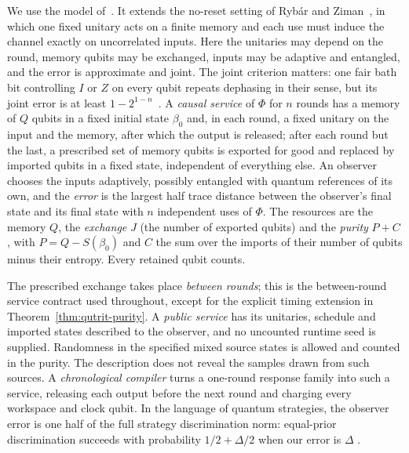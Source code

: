 We use the model of~\cite[Definition~2.3]{DouglasMghirbiB}. It extends the no-reset setting of Ryb\'ar and Ziman~\cite{RybarZiman2008},
in which one fixed unitary acts on a finite memory and each use must induce the channel exactly on uncorrelated inputs. Here the unitaries may
depend on the round, memory qubits may be exchanged, inputs may be adaptive and entangled, and the error is approximate and joint. The joint
criterion matters: one fair bath bit controlling $I$ or $Z$ on every qubit repeats dephasing in their sense, but its joint error is at least
$1-2^{1-n}$~\cite[Proposition~8.1]{DouglasClosedMemory}. A \emph{causal service} of $\Phi$ for $n$ rounds has a memory of $Q$ qubits in a
fixed initial state $\beta_0$ and, in each round, a fixed unitary on the input and the memory, after which the output is released; after each
round but the last, a prescribed set of memory qubits is exported for good and replaced by imported qubits in a fixed state, independent of
everything else. An observer chooses the inputs adaptively, possibly entangled with quantum references of its own, and the \emph{error} is
the largest half trace distance between the observer's final state and its final state with $n$ independent uses of $\Phi$. The resources are
the memory $Q$, the \emph{exchange} $J$ (the number of exported qubits) and the \emph{purity} $P+C$, with $P=Q-S(\beta_0)$ and $C$ the sum over the
imports of their number of qubits minus their entropy. Every retained qubit counts.

The prescribed exchange takes place \emph{between rounds}; this is
the between-round service contract used throughout, except for the
explicit timing extension in Theorem~\ref{thm:qutrit-purity}.
A \emph{public service} has its unitaries, schedule and imported
states described to the observer, and no uncounted runtime seed is
supplied. Randomness in the specified mixed source states is allowed
and counted in the purity. The description does not reveal the
samples drawn from such sources.
A \emph{chronological compiler} turns a one-round
response family into such a service, releasing each output before
the next round and charging every workspace and clock qubit.
In the language
of quantum strategies, the observer error is one half of the full
strategy discrimination norm: equal-prior discrimination succeeds
with probability $1/2+\Delta/2$ when our error is $\Delta$
\cite[Definition~1 and Section~3.3]{Gutoski2012}.

